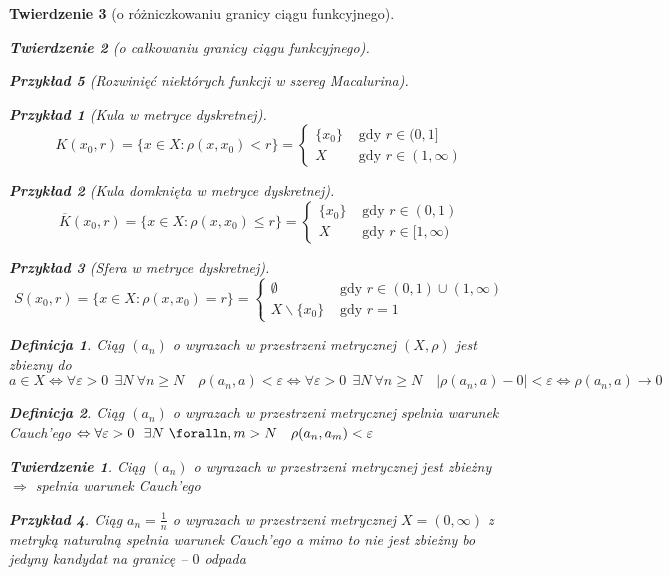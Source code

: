 \documentclass[12pt,a4paper]{article}
\newtheorem{tw}{Twierdzenie}
\newtheorem{przyklad}{Przykład}
\theoremstyle{definition}
\newtheorem{df}{Definicja}
\begin{document}
\begin{tw}[o różniczkowaniu granicy ciągu funkcyjnego]
\begin{tw}[o całkowaniu granicy ciągu funkcyjnego]
\begin{przyklad}[Rozwinięć niektórych funkcji w szereg Macalurina]
\begin{przyklad}[Kula w metryce dyskretnej]
$$K(x_0, r) = \{x\in X: \rho(x,x_0) < r\} = \begin{cases}
	\{x_0\} &\mbox{ gdy } r\in (0,1]\\
	X &\mbox{ gdy } r\in (1, \infty)
\end{cases}$$
\end{przyklad}
\begin{przyklad}[Kula domknięta w metryce dyskretnej]
$$\overline{K}(x_0, r) = \{x\in X: \rho(x,x_0) \leqslant r\} = \begin{cases}
	\{x_0\} &\mbox{ gdy } r\in (0,1)\\
	X &\mbox{ gdy } r\in [1, \infty)
\end{cases}$$
\end{przyklad}
\begin{przyklad}[Sfera w metryce dyskretnej]
$$S(x_0, r) = \{x\in X: \rho(x,x_0) = r\} = \begin{cases}
	\emptyset &\mbox{ gdy } r\in (0,1) \cup (1,\infty)\\
	X\smallsetminus\{x_0\} &\mbox{ gdy } r=1
\end{cases}$$
\end{przyklad}

\begin{df}
Ciąg $(a_n)$ o wyrazach w przestrzeni metrycznej $(X, \rho)$ jest zbiezny do $a\in X \Leftrightarrow \forall\varepsilon >0~~ \exists N ~ \forall n \geqslant N \quad \rho(a_n, a) < \varepsilon \Leftrightarrow \forall\varepsilon >0~~ \exists N ~ \forall n \geqslant N \quad |\rho(a_n, a) - 0| < \varepsilon \Leftrightarrow \rho(a_n, a) \rightarrow 0$
\end{df}

\begin{df}
Ciąg $(a_n)$ o wyrazach w przestrzeni metrycznej spelnia warunek Cauch'ego $\Leftrightarrow \forall \varepsilon >0 ~~ \exists N ~ \foralln,m > N \quad \rho(a_n, a_m) < \varepsilon$
\end{df}

\begin{tw}
Ciąg $(a_n)$ o wyrazach w przestrzeni metrycznej jest zbieżny $\Rightarrow$ spełnia warunek Cauch'ego
\end{tw}

\begin{przyklad}
Ciąg $a_n = \frac{1}{n}$ o wyrazach w przestrzeni metrycznej $X = (0, \infty)$ z metryką naturalną spełnia warunek Cauch'ego a mimo to nie jest zbieżny bo jedyny kandydat na granicę -- $0$ odpada
\end{przyklad}


\end{przyklad}
\end{tw}
\end{tw}
\end{document}
